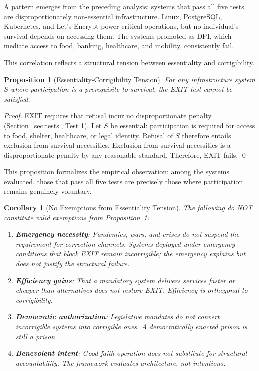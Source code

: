 \documentclass{article}
\newtheorem{proposition}{Proposition}
\newtheorem{corollary}{Corollary}
\begin{document}
A pattern emerges from the preceding analysis: systems that pass all five tests are disproportionately non-essential infrastructure. Linux, PostgreSQL, Kubernetes, and Let's Encrypt power critical operations, but no individual's survival depends on accessing them. The systems promoted as DPI, which mediate access to food, banking, healthcare, and mobility, consistently fail.

This correlation reflects a structural tension between essentiality and corrigibility.

\begin{proposition}[Essentiality-Corrigibility Tension]
\label{prop:essentiality}
For any infrastructure system $S$ where participation is a prerequisite to survival, the EXIT test cannot be satisfied.
\end{proposition}

\begin{proof}
EXIT requires that refusal incur no disproportionate penalty (Section~\ref{sec:tests}, Test 1). Let $S$ be essential: participation is required for access to food, shelter, healthcare, or legal identity. Refusal of $S$ therefore entails exclusion from survival necessities. Exclusion from survival necessities is a disproportionate penalty by any reasonable standard. Therefore, EXIT fails. \qed
\end{proof}

This proposition formalizes the empirical observation: among the systems evaluated, those that pass all five tests are precisely those where participation remains genuinely voluntary.

\begin{corollary}[No Exemptions from Essentiality Tension]
The following do NOT constitute valid exemptions from Proposition~\ref{prop:essentiality}:
\begin{enumerate}[noitemsep]
    \item \textbf{Emergency necessity}: Pandemics, wars, and crises do not suspend the requirement for correction channels. Systems deployed under emergency conditions that block EXIT remain incorrigible; the emergency explains but does not justify the structural failure.
    \item \textbf{Efficiency gains}: That a mandatory system delivers services faster or cheaper than alternatives does not restore EXIT. Efficiency is orthogonal to corrigibility.
    \item \textbf{Democratic authorization}: Legislative mandates do not convert incorrigible systems into corrigible ones. A democratically enacted prison is still a prison.
    \item \textbf{Benevolent intent}: Good-faith operation does not substitute for structural accountability. The framework evaluates architecture, not intentions.
\end{enumerate}
\end{corollary}
\end{document}
